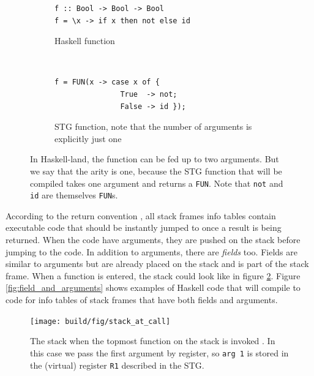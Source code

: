 \begin{figure}
\begin{mdframed}
        \begin{subfigure}[t]{0.5\textwidth}
          \begin{verbatim}
f :: Bool -> Bool -> Bool
f = \x -> if x then not else id
          \end{verbatim}
          \caption{Haskell function}
        \end{subfigure}
    ~ %
        \begin{subfigure}[t]{0.5\textwidth}
          \begin{verbatim}
f = FUN(x -> case x of {
               True  -> not;
               False -> id });
          \end{verbatim}
          \caption{STG function, note that the number of arguments is
explicitly just one}
        \end{subfigure}
  \caption{In Haskell-land, the function can be fed up to two arguments.
  But we say that the arity is one, because the STG function that will be
  compiled takes one argument and returns a \texttt{FUN}. Note that \texttt{not}
  and \texttt{id} are themselves \texttt{FUN}s.
 }
  \label{fig:tricky_arity}
\end{mdframed}
\end{figure}

According to the return convention \cite{commentary_return_convention},
all stack frames info tables contain executable code that should be
instantly jumped to once a result is being returned. When the code
have arguments, they are pushed on the stack before jumping to the code.
In addition to arguments, there are \emph{fields} too.
Fields are similar to arguments but are already placed on the stack
and is part of the stack frame. When a function is entered,
the stack could look like in figure \ref{fig:stack_at_call}. Figure \ref{fig:field_and_arguments} shows examples
of Haskell code that will compile to code for info tables
of stack frames that have both fields and arguments.

\begin{figure}
\begin{mdframed}
  \texttt{[image: build/fig/stack\_at\_call]}
  \caption{The stack when the topmost function on the stack is invoked \cite{github_stack_at_call}.
In this case we pass the first argument by register, so \texttt{arg 1}
is stored in the (virtual) register \texttt{R1} described in the STG.}
  \label{fig:stack_at_call}
\end{mdframed}
\end{figure}

